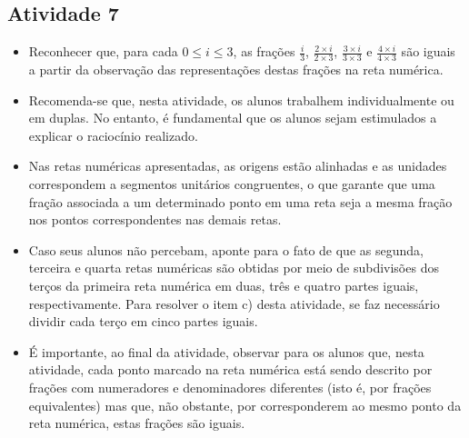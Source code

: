 \begin{multicols}{2}
\Bg

\subsection{Atividade 7}

\begin{itemize} %
    \item       Reconhecer que, para cada       $0 \leq i \leq 3$, as frações
   $\frac{i}{3}$,       $\frac{2 \times i}{2 \times 3 }$,       $\frac{3 \times
i}{3 \times 3}$       e       $\frac{4 \times i}{4 \times 3}$       são iguais a
partir da observação das representações destas frações na reta numérica.
\end{itemize} %



\begin{itemize} %
    \item       Recomenda-se que, nesta atividade, os alunos trabalhem
individualmente ou em duplas. No entanto, é fundamental que os alunos sejam
estimulados a explicar o raciocínio realizado.
    \item       Nas retas numéricas apresentadas, as origens estão alinhadas e
as unidades correspondem a segmentos unitários congruentes, o que garante que
uma fração associada a um determinado ponto em uma reta seja a mesma fração nos
pontos correspondentes nas demais retas.
    \item       Caso seus alunos não percebam, aponte para o fato de que as
segunda, terceira e quarta retas numéricas são obtidas por meio de subdivisões
dos terços da primeira reta numérica em duas, três e quatro partes iguais,
respectivamente. Para resolver o item c) desta atividade, se faz necessário
dividir cada terço em cinco partes iguais.
    \item       É importante, ao final da atividade, observar para os alunos
que, nesta atividade, cada ponto marcado na reta numérica está sendo descrito
por frações com numeradores e denominadores diferentes (isto é, por frações
equivalentes) mas que, não obstante, por corresponderem ao mesmo ponto da reta
numérica, estas frações são iguais.
\end{itemize} %


   \vspace{.1cm}

 \vspace{.1cm}


\end{multicols}
